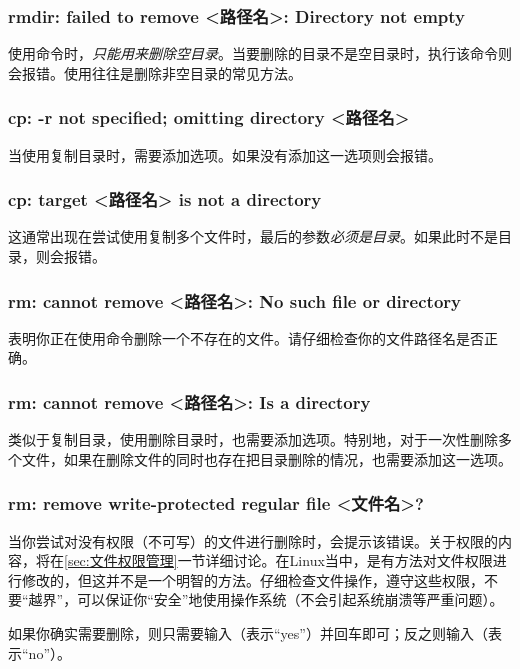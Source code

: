 \subsubsection{rmdir: failed to remove <路径名>: Directory not empty}

使用命令时，\emph{只能用来删除空目录}。当要删除的目录不是空目录时，执行该命令则会报错。使用往往是删除非空目录的常见方法。

\subsubsection{cp: -r not specified; omitting directory <路径名>}

当使用复制目录时，需要添加选项。如果没有添加这一选项则会报错。

\subsubsection{cp: target <路径名> is not a directory}

这通常出现在尝试使用复制多个文件时，最后的参数\emph{必须是目录}。如果此时不是目录，则会报错。

\subsubsection{rm: cannot remove <路径名>: No such file or directory}

表明你正在使用命令删除一个不存在的文件。请仔细检查你的文件路径名是否正确。

\subsubsection{rm: cannot remove <路径名>: Is a directory}

类似于复制目录，使用删除目录时，也需要添加选项。特别地，对于一次性删除多个文件，如果在删除文件的同时也存在把目录删除的情况，也需要添加这一选项。

\subsubsection{rm: remove write-protected regular file <文件名>? }

当你尝试对没有权限（不可写）的文件进行删除时，会提示该错误。关于权限的内容，将在\ref{sec:文件权限管理}一节详细讨论。在Linux当中，是有方法对文件权限进行修改的，但这并不是一个明智的方法。仔细检查文件操作，遵守这些权限，不要“越界”，可以保证你“安全”地使用操作系统（不会引起系统崩溃等严重问题）。

如果你确实需要删除，则只需要输入（表示“yes”）并回车即可；反之则输入（表示“no”）。

